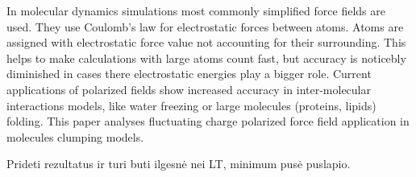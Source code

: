 In molecular dynamics simulations most commonly simplified force fields are used.
They use Coulomb's law for electrostatic forces between atoms. Atoms are assigned with electrostatic force value not accounting for their surrounding.
This helps to make calculations with large atoms count fast, but accuracy is noticebly diminished in cases there electrostatic energies play a bigger role.
Current applications of polarized fields show increased accuracy in inter-molecular interactions models, like water freezing or large molecules (proteins, lipids) folding.
This paper analyses fluctuating charge polarized force field application in molecules clumping models.


Prideti rezultatus ir turi buti ilgesnė nei LT, minimum pusė puslapio.
